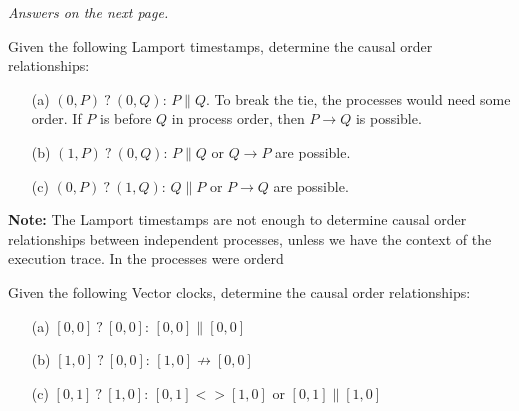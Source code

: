 \hfill \textit{Answers on the next page.}\hfill \null

\newpage 

\begin{Answer} Given the following Lamport timestamps, determine the causal order relationships:

    \begin{itemize}
        \item[(a)] $(0,P)\ ?\ (0,Q)$: $P \parallel Q$. To break the tie, the processes would need some order. If $P$ is before $Q$ in process order, then $P \rightarrow Q$ is possible.
        \item[(b)] $(1,P)\ ?\ (0,Q)$: $P \parallel Q$ or $Q \rightarrow P$ are possible.
        \item[(c)] $(0,P)\ ?\ (1,Q)$: $Q \parallel P$ or $P \rightarrow Q$ are possible.
    \end{itemize}

    \noindent
    \textbf{Note:} The Lamport timestamps are not enough to determine causal order relationships between independent processes, unless 
    we have the context of the execution trace. In the processes were orderd
\end{Answer}

\begin{Answer} Given the following Vector clocks, determine the causal order relationships:

    \begin{itemize}
        \item[(a)] $[0,0]\ ?\ [0,0]$: $[0,0] \parallel [0,0]$
        \item[(b)] $[1,0]\ ?\ [0,0]$: $[1,0] \not\rightarrow [0,0]$
        \item[(c)] $[0,1]\ ?\ [1,0]$: $[0,1] <> [1,0]$ or $[0,1] \parallel [1,0]$
    \end{itemize}
\end{Answer}